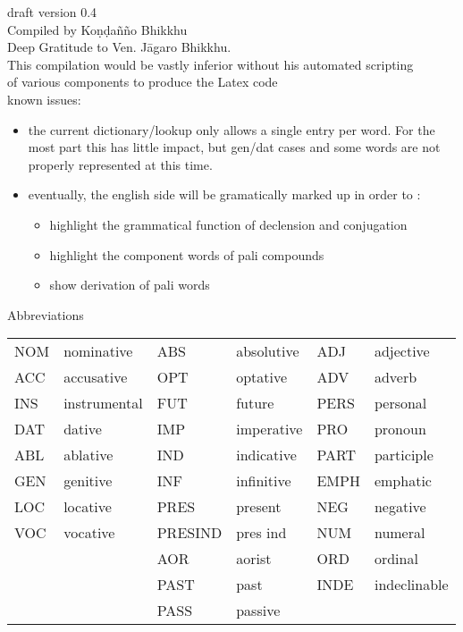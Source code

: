 \begin{rightcolumn}
\begin{center}
\vspace*{4cm}
{\footnotesize
draft version 0.4\\
Compiled by Koṇḍañño Bhikkhu\\
\vspace*{2ex}
Deep Gratitude to Ven. Jāgaro Bhikkhu.\\
\vspace*{1ex}
This compilation would be vastly inferior without his automated scripting\\
of various components to produce the Latex code\\
\vspace*{1cm}
known issues:
\begin{itemize}
\item the current dictionary/lookup only allows a single entry per word. For the most part this has little impact, but gen/dat cases and some words are not properly represented at this time.\\
\item eventually, the english side will be gramatically marked up in order to :\\
	\begin{itemize}
	\item highlight the grammatical function of declension and conjugation
	\item highlight the component words of pali compounds
	\item show derivation of pali words
	\end{itemize}
\end{itemize}
}

\vspace*{1cm}
Abbreviations\\[.3cm]
{\scriptsize
\begin{tabular}{p{}
				p{}
				p{}
				p{}
				p{}
				p{}}
NOM	&	nominative	&	ABS		&absolutive	&	ADJ	&	adjective\\
ACC	&	accusative	&	OPT		&optative	&	ADV	&	adverb\\
INS	&	instrumental&	FUT		&future		&	PERS&	personal\\
DAT	&	dative		&	IMP		&imperative	&	PRO	&	pronoun\\
ABL	&	ablative	&	IND		&indicative	&	PART&	participle\\
GEN	&	genitive	&	INF		&infinitive	&	EMPH&	emphatic\\
LOC	&	locative	&	PRES	&present	&	NEG	&	negative\\
VOC	&	vocative	&	PRESIND	&pres ind	&	NUM	&	numeral\\
	&				&	AOR		&aorist		&	ORD	&	ordinal\\
	&				&	PAST	&past		&	INDE&	indeclinable\\
	&				&	PASS	&passive	&		&	\\

\end{tabular}
}
\end{center}
\end{rightcolumn}
\flushpage
